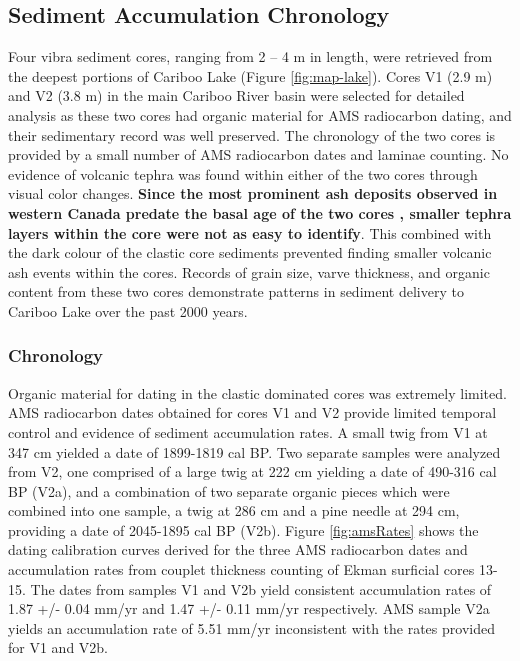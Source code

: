 \documentclass[Royal,times,doublespace,sageh]{sagej}
\begin{document}
\hypertarget{sediment-accumulation-chronology}{%
\subsection{Sediment Accumulation
Chronology}\label{sediment-accumulation-chronology}}

Four vibra sediment cores, ranging from 2 -- 4 m in length, were
retrieved from the deepest portions of Cariboo Lake (Figure
\ref{fig:map-lake}). Cores V1 (2.9 m) and V2 (3.8 m) in the main Cariboo
River basin were selected for detailed analysis as these two cores had
organic material for AMS radiocarbon dating, and their sedimentary
record was well preserved. The chronology of the two cores is provided
by a small number of AMS radiocarbon dates and laminae counting. No
evidence of volcanic tephra was found within either of the two cores
through visual color changes. \textbf{Since the most prominent ash
deposits observed in western Canada predate the basal age of the two
cores \citep{Westgate1977, Hallett1997}, smaller tephra layers within
the core were not as easy to identify}. This combined with the dark
colour of the clastic core sediments prevented finding smaller volcanic
ash events within the cores. Records of grain size, varve thickness, and
organic content from these two cores demonstrate patterns in sediment
delivery to Cariboo Lake over the past 2000 years.

\hypertarget{chronology}{%
\subsubsection{Chronology}\label{chronology}}

Organic material for dating in the clastic dominated cores was extremely
limited. AMS radiocarbon dates obtained for cores V1 and V2 provide
limited temporal control and evidence of sediment accumulation rates. A
small twig from V1 at 347 cm yielded a date of 1899-1819 cal BP. Two
separate samples were analyzed from V2, one comprised of a large twig at
222 cm yielding a date of 490-316 cal BP (V2a), and a combination of two
separate organic pieces which were combined into one sample, a twig at
286 cm and a pine needle at 294 cm, providing a date of 2045-1895 cal BP
(V2b). Figure \ref{fig:amsRates} shows the dating calibration curves
derived for the three AMS radiocarbon dates and accumulation rates from
couplet thickness counting of Ekman surficial cores 13-15. The dates
from samples V1 and V2b yield consistent accumulation rates of 1.87 +/-
0.04 mm/yr and 1.47 +/- 0.11 mm/yr respectively. AMS sample V2a yields
an accumulation rate of 5.51 mm/yr inconsistent with the rates provided
for V1 and V2b.
\end{document}
